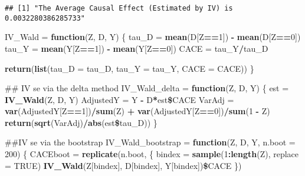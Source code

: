 \documentclass[]{article}
\newenvironment{Shaded}{\begin{snugshade}}{\end{snugshade}}
\newcommand{\KeywordTok}[1]{\textcolor[rgb]{0.13,0.29,0.53}{\textbf{#1}}}
\newcommand{\DataTypeTok}[1]{\textcolor[rgb]{0.13,0.29,0.53}{#1}}
\newcommand{\DecValTok}[1]{\textcolor[rgb]{0.00,0.00,0.81}{#1}}
\newcommand{\StringTok}[1]{\textcolor[rgb]{0.31,0.60,0.02}{#1}}
\newcommand{\OtherTok}[1]{\textcolor[rgb]{0.56,0.35,0.01}{#1}}
\newcommand{\ControlFlowTok}[1]{\textcolor[rgb]{0.13,0.29,0.53}{\textbf{#1}}}
\newcommand{\OperatorTok}[1]{\textcolor[rgb]{0.81,0.36,0.00}{\textbf{#1}}}
\newcommand{\NormalTok}[1]{#1}
\begin{document}
\begin{verbatim}
## [1] "The Average Causal Effect (Estimated by IV) is 0.0032280386285733"
\end{verbatim}

\begin{Shaded}
\begin{Highlighting}[]
\NormalTok{IV_Wald =}\StringTok{ }\ControlFlowTok{function}\NormalTok{(Z, D, Y)}
\NormalTok{\{}
\NormalTok{       tau_D =}\StringTok{ }\KeywordTok{mean}\NormalTok{(D[Z}\OperatorTok{==}\DecValTok{1}\NormalTok{]) }\OperatorTok{-}\StringTok{ }\KeywordTok{mean}\NormalTok{(D[Z}\OperatorTok{==}\DecValTok{0}\NormalTok{])}
\NormalTok{       tau_Y =}\StringTok{ }\KeywordTok{mean}\NormalTok{(Y[Z}\OperatorTok{==}\DecValTok{1}\NormalTok{]) }\OperatorTok{-}\StringTok{ }\KeywordTok{mean}\NormalTok{(Y[Z}\OperatorTok{==}\DecValTok{0}\NormalTok{])}
\NormalTok{       CACE  =}\StringTok{ }\NormalTok{tau_Y}\OperatorTok{/}\NormalTok{tau_D}
       
       \KeywordTok{return}\NormalTok{(}\KeywordTok{list}\NormalTok{(}\DataTypeTok{tau_D =}\NormalTok{ tau_D, }\DataTypeTok{tau_Y =}\NormalTok{ tau_Y,}
                   \DataTypeTok{CACE  =}\NormalTok{ CACE))}
\NormalTok{\}}

\NormalTok{## IV se via the delta method}
\NormalTok{IV_Wald_delta =}\StringTok{ }\ControlFlowTok{function}\NormalTok{(Z, D, Y)}
\NormalTok{\{}
\NormalTok{       est         =}\StringTok{ }\KeywordTok{IV_Wald}\NormalTok{(Z, D, Y)}
\NormalTok{       AdjustedY   =}\StringTok{ }\NormalTok{Y }\OperatorTok{-}\StringTok{ }\NormalTok{D}\OperatorTok{*}\NormalTok{est}\OperatorTok{\$}\NormalTok{CACE}
\NormalTok{       VarAdj      =}\StringTok{ }\KeywordTok{var}\NormalTok{(AdjustedY[Z}\OperatorTok{==}\DecValTok{1}\NormalTok{])}\OperatorTok{/}\KeywordTok{sum}\NormalTok{(Z) }\OperatorTok{+}\StringTok{ }
\StringTok{                          }\KeywordTok{var}\NormalTok{(AdjustedY[Z}\OperatorTok{==}\DecValTok{0}\NormalTok{])}\OperatorTok{/}\KeywordTok{sum}\NormalTok{(}\DecValTok{1} \OperatorTok{-}\StringTok{ }\NormalTok{Z)}
       \KeywordTok{return}\NormalTok{(}\KeywordTok{sqrt}\NormalTok{(VarAdj)}\OperatorTok{/}\KeywordTok{abs}\NormalTok{(est}\OperatorTok{\$}\NormalTok{tau_D))}
\NormalTok{\}}

\NormalTok{##IV se via the bootstrap}
\NormalTok{IV_Wald_bootstrap =}\StringTok{ }\ControlFlowTok{function}\NormalTok{(Z, D, Y, }\DataTypeTok{n.boot =} \DecValTok{200}\NormalTok{)}
\NormalTok{\{}
\NormalTok{       CACEboot  =}\StringTok{ }\KeywordTok{replicate}\NormalTok{(n.boot,}
\NormalTok{                   \{}
\NormalTok{                   bindex =}\StringTok{ }\KeywordTok{sample}\NormalTok{(}\DecValTok{1}\OperatorTok{:}\KeywordTok{length}\NormalTok{(Z), }\DataTypeTok{replace =} \OtherTok{TRUE}\NormalTok{)}
                   \KeywordTok{IV_Wald}\NormalTok{(Z[bindex], D[bindex], Y[bindex])}\OperatorTok{\$}\NormalTok{CACE}
\NormalTok{                   \})}
       

\end{Highlighting}
\end{Shaded}
\end{document}
